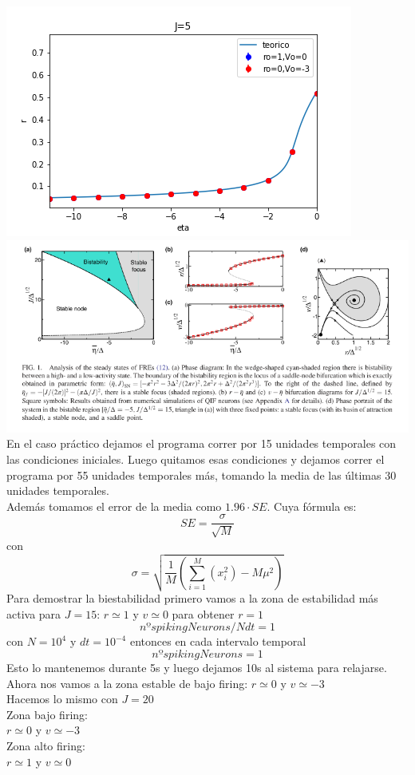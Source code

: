\documentclass[a4paper]{article}
\begin{document}
\includegraphics[scale=0.7]{r_vs_eta_J5.png}\\
\includegraphics[scale=0.4]{diagramaspaper.png}\\

En el caso práctico dejamos el programa correr por 15 unidades temporales con las condiciones iniciales. Luego quitamos esas condiciones y dejamos correr el programa por 55 unidades temporales más, tomando la media de las últimas 30 unidades temporales.\\
Además tomamos el error de la media como $1.96\cdot SE$. Cuya fórmula es:
$$SE = \frac{\sigma}{\sqrt{M}}$$
con
$$\sigma = \sqrt{\frac{1}{M}\left(\sum^M_ {i=1} (x^2_i)-M\mu^2\right)} $$
Para demostrar la biestabilidad primero vamos a la zona de estabilidad más activa para $ J = 15$:
$r\simeq 1$ y $ v\simeq 0$
para obtener  $r = 1$
$$nºspikingNeurons/Ndt = 1$$
con $N = 10^4$ y $dt = 10^{-4}$
entonces en cada intervalo temporal
$$nºspikingNeurons = 1$$
Esto lo mantenemos durante 5s y luego dejamos 10s al sistema para relajarse.
Ahora nos vamos a la zona estable de bajo firing:
$r\simeq 0$ y $ v\simeq -3$\\

Hacemos lo mismo con $J = 20$\\
Zona bajo firing:\\
$r\simeq 0$ y $ v\simeq -3$\\
Zona alto firing:\\
$r\simeq 1$ y $ v\simeq 0$\\
\end{document}
